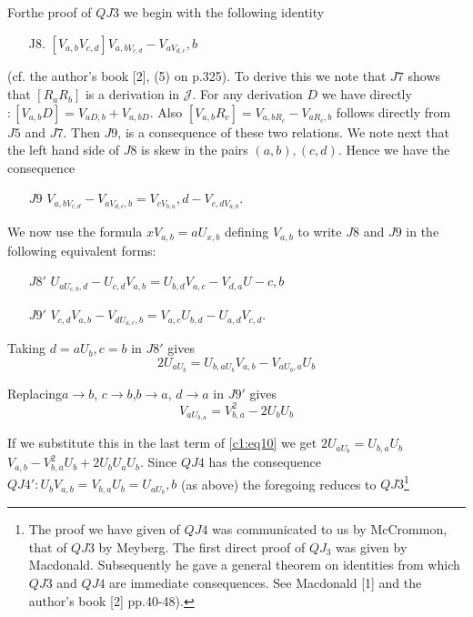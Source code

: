 For\pageoriginale the proof of $QJ3$ we begin with the following identity
\begin{itemize}
\item[J8.] $[V_{a,b}V_{c,d}]V_{a,bV_{c,d}}-V_{aV_{d,c}},b$
\end{itemize}
(cf. the author's book [2], (5) on p.325). To derive
this we note that $J7$ shows that $[R_aR_b]$ is a derivation in
$\mathscr{J}$. For any derivation $D$ we have directly
$:[V_{a,b}D]=V_{aD,b}+V_{a,bD}$. Also $[V_{a,b} R_c]=V_{a,b R_c}-V_{a
  R_c, b}$ follows directly from $J5$ and $J7$. Then $J9$, is a
consequence of these two relations. We note next that the left hand
side of $J8$ is skew in the pairs $(a,b),(c,d)$. Hence we have the
consequence 
\begin{itemize}
\item[$J9$] $V_{a,bV_{c,d}}-V_{aV_{d,c},b}=V_{c V_{b,a}},d-V_{c,dV_{a,b}}$.
\end{itemize}
We now use the formula $xV_{a,b}=aU_{x,b}$ defining $V_{a,b}$ to write
$J8$ and $J9$ in the following equivalent forms: 
\begin{itemize}
\item[$J8'$] $U_{aU_{c,b},d}-U_{c,d}V_{a,b}=U_{b,d}V_{a,c}-V_{d,a}U-{c,b}$

\item[$J9'$] $V_{c,d}V_{a,b}-V_{d U_{a,c},b}=V_{a,c} U_{b,d} -U_{a,d} V_{c,d}$.
\end{itemize}
Taking $d=aU_b,c=b$ in $J8'$ gives
\begin{equation*}
2U_{aU_{b}}=U_{b,aU_{b}}V_{a,b}-V_{aU_{b},a}U_b\tag{10}\label{c1:eq10}
\end{equation*}

Replacing\pageoriginale $a\to b$, $c\to b$,$ b\to a$, $d\to a$ in $J9'$ gives
\begin{equation*}
V_{aU_{b,a}}=V^{2}_{b,a}-2U_bU_b\tag{11}\label{c1:eq11}
\end{equation*}

If we substitute this in the last term of \eqref{c1:eq10} we get
$2U_{aU_{b}}=U_{b,a} U_{b}$ $V_{a,b} - V^2_{b,a} U_b +2U_bU_aU_b$. Since
$QJ4$ has the consequence 
$QJ4':U_b V_{a,b}=V_{b,a}U_b=U_{aU_{b}},b$ (as above) the
foregoing reduces to $QJ3$\footnote{The proof we have given of $QJ4$
  was communicated to us by McCrommon, that of $QJ3$ by Meyberg. The
  first direct proof of $QJ_3$ was given by Macdonald. Subsequently he
  gave a general theorem on identities from which $QJ3$ and $QJ4$ are
  immediate consequences. See Macdonald [1] and the author's book
  [2] pp.40-48).} 

